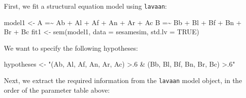 \documentclass[
]{book}
\newenvironment{Shaded}{\begin{snugshade}}{\end{snugshade}}
\newcommand{\AttributeTok}[1]{\textcolor[rgb]{0.77,0.63,0.00}{#1}}
\newcommand{\ConstantTok}[1]{\textcolor[rgb]{0.00,0.00,0.00}{#1}}
\newcommand{\FunctionTok}[1]{\textcolor[rgb]{0.00,0.00,0.00}{#1}}
\newcommand{\NormalTok}[1]{#1}
\newcommand{\OtherTok}[1]{\textcolor[rgb]{0.56,0.35,0.01}{#1}}
\newcommand{\StringTok}[1]{\textcolor[rgb]{0.31,0.60,0.02}{#1}}
\begin{document}
First, we fit a structural equation model using \texttt{lavaan}:

\begin{Shaded}
\begin{Highlighting}[]
\NormalTok{model1 }\OtherTok{\textless{}{-}} \StringTok{\textquotesingle{}A =\textasciitilde{} Ab + Al + Af + An + Ar + Ac }
\StringTok{           B =\textasciitilde{} Bb + Bl + Bf + Bn + Br + Bc\textquotesingle{}}
\NormalTok{fit1 }\OtherTok{\textless{}{-}} \FunctionTok{sem}\NormalTok{(model1, }\AttributeTok{data =}\NormalTok{ sesamesim, }\AttributeTok{std.lv =} \ConstantTok{TRUE}\NormalTok{)}
\end{Highlighting}
\end{Shaded}

We want to specify the following hypotheses:

\begin{Shaded}
\begin{Highlighting}[]
\NormalTok{hypotheses }\OtherTok{\textless{}{-}} \StringTok{"(Ab, Al, Af, An, Ar, Ac) \textgreater{}.6 \&}
\StringTok{               (Bb, Bl, Bf, Bn, Br, Bc) \textgreater{}.6"}
\end{Highlighting}
\end{Shaded}

Next, we extract the required information from the \texttt{lavaan} model object, in the order of the parameter table above:
\end{document}
